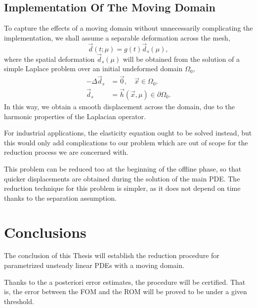 \documentclass[../main.tex]{subfiles}
\begin{document}
\subsection{Implementation Of The Moving Domain}
To capture the effects of a moving domain without unnecessarily complicating the implementation, we shall assume a separable deformation across the mesh, 
\begin{equation*}
   \vec{d}(t;\mu) = g(t) \vec{d}_s(\mu),
\end{equation*}
where the spatial deformation $\vec{d}_s(\mu)$ will be obtained from the solution of a simple Laplace problem over an initial undeformed domain $\Omega_0$,
\begin{align*}
   -\Delta \vec{d}_s &= \vec{0}, \quad \vec{x} \in \Omega_0, \\
   \vec{d}_s &= \vec{h}(\vec{x}, \mu) \in \partial\Omega_0.
\end{align*}
In this way, we obtain a smooth displacement across the domain, due to the harmonic properties of the Laplacian operator. 

For industrial applications, the elasticity equation ought to be solved instead, but this would only add complications to our problem which are out of scope for the reduction process we are concerned with.

This problem can be reduced too at the beginning of the offline phase, so that quicker displacements are obtained during the solution of the main PDE. 
The reduction technique for this problem is simpler, as it does not depend on time thanks to the separation assumption. 







\section{Conclusions}
\label{sec:conclusions}
The conclusion of this Thesis will establish the reduction procedure for parametrized unsteady linear PDEs with a moving domain.

Thanks to the a posteriori error estimates, the procedure will be certified.
That is, the error between the FOM and the ROM will be proved to be under a given threshold. 
\end{document}
